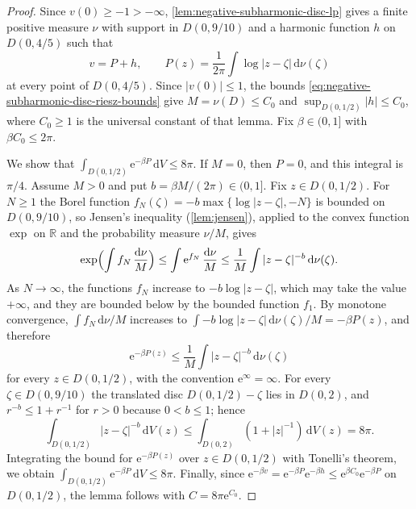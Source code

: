 \begin{proof}
Since $v(0)\geq-1>-\infty$, \cref{lem:negative-subharmonic-disc-lp} gives a finite positive measure $\nu$ with support in $D(0,9/10)$ and a harmonic function $h$ on $D(0,4/5)$ such that
\[
 v=P+h,\qquad
 P(z)=\frac1{2\pi}\int\log|z-\zeta|\,\mathrm d\nu(\zeta)
\]
at every point of $D(0,4/5)$. Since $|v(0)|\leq1$, the bounds \eqref{eq:negative-subharmonic-disc-riesz-bounds} give $M=\nu(D)\leq C_0$ and $\sup_{D(0,1/2)}|h|\leq C_0$, where $C_0\geq1$ is the universal constant of that lemma. Fix $\beta\in(0,1]$ with $\beta C_0\leq2\pi$.

We show that $\int_{D(0,1/2)}\mathrm e^{-\beta P}\,\mathrm dV\leq8\pi$. If $M=0$, then $P=0$, and this integral is $\pi/4$. Assume $M>0$ and put $b=\beta M/(2\pi)\in(0,1]$. Fix $z\in D(0,1/2)$. For $N\geq1$ the Borel function $f_N(\zeta)=-b\max\{\log|z-\zeta|,-N\}$ is bounded on $D(0,9/10)$, so Jensen's inequality (\cref{lem:jensen}), applied to the convex function $\exp$ on $\mathbb R$ and the probability measure $\nu/M$, gives
\[
 \exp\Bigl(\int f_N\,\frac{\mathrm d\nu}M\Bigr)\leq\int\mathrm e^{f_N}\,\frac{\mathrm d\nu}M\leq\frac1M\int|z-\zeta|^{-b}\,\mathrm d\nu(\zeta).
\]
As $N\to\infty$, the functions $f_N$ increase to $-b\log|z-\zeta|$, which may take the value $+\infty$, and they are bounded below by the bounded function $f_1$. By monotone convergence, $\int f_N\,\mathrm d\nu/M$ increases to $\int-b\log|z-\zeta|\,\mathrm d\nu(\zeta)/M=-\beta P(z)$, and therefore
\[
 \mathrm e^{-\beta P(z)}\leq\frac1M\int|z-\zeta|^{-b}\,\mathrm d\nu(\zeta)
\]
for every $z\in D(0,1/2)$, with the convention $\mathrm e^{\infty}=\infty$. For every $\zeta\in D(0,9/10)$ the translated disc $D(0,1/2)-\zeta$ lies in $D(0,2)$, and $r^{-b}\leq1+r^{-1}$ for $r>0$ because $0<b\leq1$; hence
\[
 \int_{D(0,1/2)}|z-\zeta|^{-b}\,\mathrm dV(z)
   \leq\int_{D(0,2)}(1+|z|^{-1})\,\mathrm dV(z)=8\pi.
\]
Integrating the bound for $\mathrm e^{-\beta P(z)}$ over $z\in D(0,1/2)$ with Tonelli's theorem, we obtain $\int_{D(0,1/2)}\mathrm e^{-\beta P}\,\mathrm dV\leq8\pi$. Finally, since $\mathrm e^{-\beta v}=\mathrm e^{-\beta P}\mathrm e^{-\beta h}\leq\mathrm e^{\beta C_0}\mathrm e^{-\beta P}$ on $D(0,1/2)$, the lemma follows with $C=8\pi\mathrm e^{C_0}$.
\end{proof}

